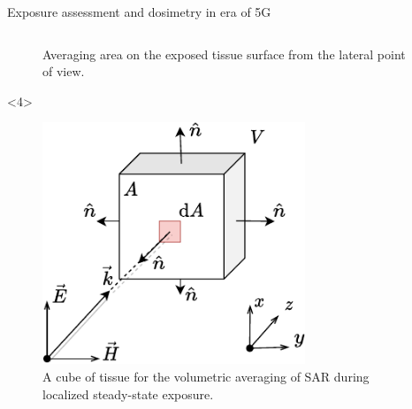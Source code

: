\documentclass[xcolor=dvipsnames,10pt]{beamer}
\begin{document}
\begin{frame}{Exposure assessment and dosimetry in era of 5G}
\begin{columns}[c]
\begin{column}{0.5\textwidth}
\begin{onlyenv}
\begin{center}
\begin{figure}
                    \caption{Averaging area on the exposed tissue surface from the lateral point of view.}
                \end{figure}
                \end{center}
            \end{onlyenv}
            \begin{onlyenv}<4>
                \begin{center}
                \begin{figure}
                    \includegraphics[width=0.7\textwidth]{figures/exposed_tissue_volume.pdf}
                    \caption{A cube of tissue for the volumetric averaging of SAR during localized steady-state exposure.}
                \end{figure}
                \end{center}
            \end{onlyenv}
        \end{column}
    \end{columns} 
\end{frame}
\end{document}

